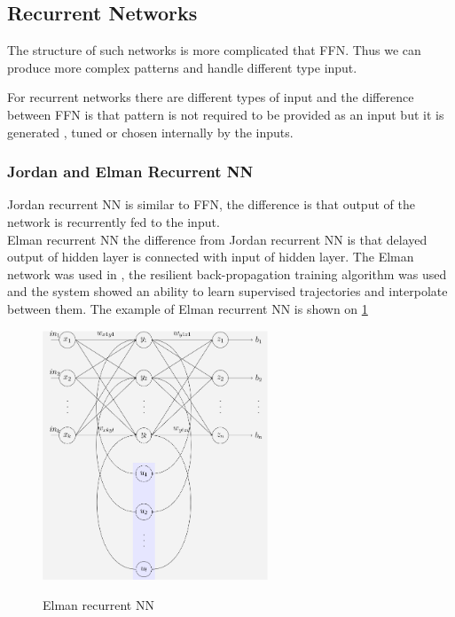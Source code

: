 \documentclass[11pt,a4paper]{report}
\begin{document}
			\subsection{Recurrent Networks}
				The structure of such networks is more complicated that FFN. Thus we can produce more complex patterns and handle different type input.
				
				For recurrent networks there are different types of input and the difference between FFN is that pattern is not required to be provided as an input but it is generated , tuned or chosen internally by the inputs. 
				
				\subsubsection{Jordan and Elman Recurrent NN}
					Jordan recurrent NN is similar to FFN, the difference is that output of the network is recurrently fed to the input.\\
					Elman recurrent NN the difference from Jordan recurrent NN is that delayed output of hidden layer is connected with input of hidden layer. The Elman network was used in \cite{berns1995neural}, the resilient back-propagation training algorithm was used and the system showed an ability to learn supervised trajectories and interpolate between them. The example of Elman recurrent NN is shown on \ref{fig:5} 
					
					\begin{figure}[h!]
						\vspace{-0.2cm}
						\centering
						{\includegraphics[width=0.6\textwidth]{5}}
						\caption{Elman recurrent NN}
						\label{fig:5}
						\vspace{-0.1cm}
					\end{figure}
					
\end{document}
